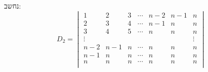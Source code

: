 \documentclass{article}
\begin{document}
נחשב:
\[
    D_2 = \begin{vmatrix}
        1      & 2   & 3 & \cdots & n-2 & n-1 & n      \\
        2      & 3   & 4 & \cdots & n-1 & n   & n      \\
        3      & 4   & 5 & \cdots & n   & n   & n      \\
        \vdots &     &   &        &     &     & \vdots \\
        n-2    & n-1 & n & \cdots & n   & n   & n      \\
        n-1    & n   & n & \cdots & n   & n   & n      \\
        n      & n   & n & \cdots & n   & n   & n      \\
    \end{vmatrix}
\]

\pagebreak
\end{document}
